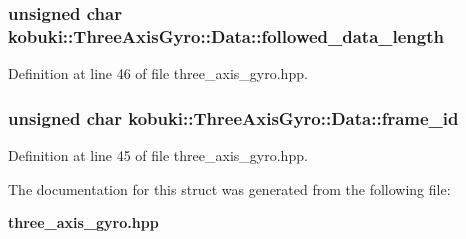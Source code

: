 \subsubsection[{followed\-\_\-data\-\_\-length}]{\setlength{\rightskip}{0pt plus 5cm}unsigned char {\bf kobuki\-::\-Three\-Axis\-Gyro\-::\-Data\-::followed\-\_\-data\-\_\-length}}\label{structkobuki_1_1ThreeAxisGyro_1_1Data_a09d531b38cd9c41ebb4a6c5656c5026b}


\-Definition at line 46 of file three\-\_\-axis\-\_\-gyro.\-hpp.

\subsubsection[{frame\-\_\-id}]{\setlength{\rightskip}{0pt plus 5cm}unsigned char {\bf kobuki\-::\-Three\-Axis\-Gyro\-::\-Data\-::frame\-\_\-id}}\label{structkobuki_1_1ThreeAxisGyro_1_1Data_a69a8bea4b2d5129175788de1bf245b45}


\-Definition at line 45 of file three\-\_\-axis\-\_\-gyro.\-hpp.



\-The documentation for this struct was generated from the following file\-:\begin{DoxyCompactItemize}
\item 
{\bf three\-\_\-axis\-\_\-gyro.\-hpp}\end{DoxyCompactItemize}
